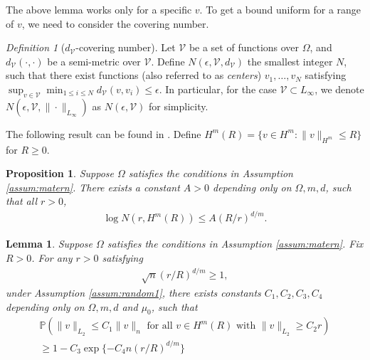 \documentclass[12pt]{article}
\theoremstyle{plain}
\newtheorem{proposition}{Proposition}
\newtheorem{lemma}{Lemma}
\theoremstyle{remark}
\newtheorem{definition}{Definition}
\begin{document}
The above lemma works only for a specific $v$. To get a bound uniform for a range of $v$, we need to consider the covering number.

\begin{definition}[$d_\mathcal{V}$-covering number]
    Let $\mathcal{V}$ be a set of functions over $\Omega$, and $d_\mathcal{V}(\cdot,\cdot)$ be a semi-metric over $\mathcal{V}$. Define $N(\epsilon,\mathcal{V},d_\mathcal{V})$ the smallest integer $N$, such that there exist functions (also referred to as \textit{centers}) $v_1,\ldots,v_N$ satisfying $\sup_{v\in\mathcal{V}}\min_{1\leq i\leq N}d_\mathcal{V}(v,v_i)\leq \epsilon$. In particular, for the case $\mathcal{V}\subset L_\infty$, we denote $N(\epsilon,\mathcal{V},\|\cdot\|_{L_\infty})$ as $N(\epsilon,\mathcal{V})$ for simplicity.
\end{definition}


The following result can be found in \cite{edmunds2008function}. Define $H^m(R)=\{v\in H^m:\|v\|_{H^m}\leq R\}$ for $R\geq 0$. 

\begin{proposition}
Suppose $\Omega$ satisfies the conditions in Assumption \ref{assum:matern}.
    There exists a constant $A>0$ depending only on $\Omega,m,d$, such that all $r>0$,
    \begin{eqnarray}\label{entropy}
        \log N(r,H^m(R))\leq A(R/r)^{d/m}.
    \end{eqnarray}
\end{proposition}


\begin{lemma}\label{lemma:step2}
Suppose $\Omega$ satisfies the conditions in Assumption \ref{assum:matern}.
    Fix $R>0$. For any $r>0$ satisfying 
    \begin{eqnarray}
        \sqrt{n}(r/R)^{d/m}\geq 1,\label{epsilon}
    \end{eqnarray}
    under Assumption \ref{assum:random1},
   there exists constants $C_1,C_2,C_3,C_4$ depending only on $\Omega,m,d$ and $\mu_0$, such that
   \begin{eqnarray*}
       \mathbb{P}\left(\|v\|_{L_2}\leq C_1 \|v\|_n \text{ for all } v\in H^m(R) \text{ with } \|v\|_{L_2}\geq C_2r\right)\\\geq 1-C_3\exp\{-C_4n(r/R)^{d/m}\}
   \end{eqnarray*}
\end{lemma}
\end{document}
